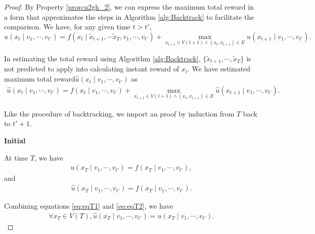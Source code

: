 \begin{lem}
\begin{proof}
By Property \ref{prop:u2gh_2}, we can express the maximum total reward in a form that approximates the steps in Algorithm \ref{alg:Backtrack} to facilitate the comparison.
We have, for any given time $ t > t' $,
\begin{equation}
\label{eq:def_g_2}
u( x_{t} \mid v_{1} , \cdots , v_{t'} ) = f( x_{t} \mid \tilde{x}_{t+1}, \cdots \tilde{x}_{T}, v_{1} , \cdots , v_{t'} ) +  \max_{x_{t+1} \in V(t+1) \land ( x_{t}, x_{t+1} ) \in E } u( x_{t+1} \mid v_{1} , \cdots , v_{t'} ).
\end{equation}

In estimating the total reward using Algorithm \ref{alg:Backtrack}, $ \{ \tilde{x}_{t+1}, \cdots , \tilde{x}_{T} \} $ is not predicted to apply into calculating instant reward of $ x_{t} $.
We have estimated maximum total reward$ \hat{u}(x_{t} \mid v_{1} , \cdots , v_{t'} ) $ as 
\begin{equation}
\label{eq:defHatG}
\begin{aligned}
\hat{u}( x_{t} \mid v_{1} , \cdots , v_{t'} ) = f( x_{t} \mid v_{1} , \cdots , v_{t'} ) + \max_{ x_{t+1} \in V(t+1) \land ( x_{t}, x_{t+1} ) \in E } \hat{u}( x_{t+1} \mid v_{1} , \cdots , v_{t'} ).
\end{aligned}
\end{equation}

Like the procedure of backtracking, we import an proof by induction from $ T $ back to $ t' + 1 $.

\textbf{Initial}

At time $ T $, we have
\begin{equation}
\label{eq:eqT1}
\begin{aligned}
u( x_{T} \mid  v_{1} , \cdots , v_{t'} ) = f( x_{T} \mid v_{1} , \cdots , v_{t'} ),
\end{aligned}
\end{equation}
and
\begin{equation}
\label{eq:eqT2}
\begin{aligned}
\hat{u}( x_{T} \mid v_{1} , \cdots , v_{t'} ) = f( x_{T} \mid v_{1} , \cdots , v_{t'} ).
\end{aligned}
\end{equation}

Combining equations \eqref{eq:eqT1} and \eqref{eq:eqT2}, we have
\begin{equation}
\label{eq:inductionInit}
\begin{aligned}
\forall x_{T} \in V(T), \hat{u}( x_{T} \mid v_{1} , \cdots , v_{t'} ) = u( x_{T} \mid v_{1} , \cdots , v_{t'} ).
\end{aligned}
\end{equation}


\end{proof}
\end{lem}
